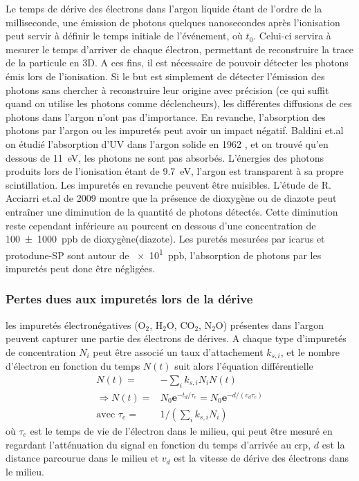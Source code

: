         Le temps de dérive des électrons dans l'argon liquide étant de l'ordre de la milliseconde, une émission de photons quelques nanosecondes après l'ionisation peut servir à définir le temps initiale de l'événement, où $t_0$. Celui-ci servira à mesurer le temps d'arriver de chaque électron, permettant de reconstruire la trace de la particule en 3D. A ces fins, il est nécessaire de pouvoir détecter les photons émis lors de l'ionisation. Si le but est simplement de détecter l'émission des photons sans chercher à reconstruire leur origine avec précision (ce qui suffit quand on utilise les photons comme déclencheurs), les différentes diffusions de ces photons dans l'argon n'ont pas d'importance. En revanche, l'absorption des photons par l'argon ou les impuretés peut avoir un impact négatif. Baldini et.al on étudié l'absorption d'UV dans l'argon solide en 1962 \cite{Baldini1962}, et on trouvé qu'en dessous de \SI{11}{\eV}, les photons ne sont pas absorbés. L'énergies des photons produits lors de l'ionisation étant de \SI{9.7}{\eV}, l'argon est transparent à sa propre scintillation. Les impuretés en revanche peuvent être nuisibles. L'étude de R. Acciarri et.al de 2009\cite{Acciarri2009} montre que la présence de dioxygène ou de diazote peut entraîner une diminution de la quantité de photons détectés. Cette diminution reste cependant inférieure au pourcent en dessous d'une concentration de \SI{100(1000)}{ppb} de dioxygène(diazote). Les puretés mesurées par \gls{icarus}\cite{Antonello2014} et proto\gls{dune}-SP sont autour de \SI{e1}{ppb}, l'absorption de photons par les impuretés peut donc être négligées.

      \subsubsection{Pertes dues aux impuretés lors de la dérive}
        
        les impuretés électronégatives (O$_2$, H$_2$O, CO$_2$, N$_2$O) présentes dans l'argon peuvent capturer une partie des électrons de dérives. A chaque type d'impuretés de concentration $N_i$ peut être associé un taux d'attachement $k_{s,i}$, et le nombre d'électron en fonction du temps $N(t)$ suit alors l'équation différentielle\cite{Buckley1989}
        \begin{eqnarray}
          N(t) = & -\sum_{i} k_{s,i}N_i N(t)\\
          \Rightarrow N(t) = & N_0\textbf{e}^{-t_d/\tau_e}=N_0\textbf{e}^{-d/(v_d\tau_e)}\label{eq::losses} \\
          \text{avec } \tau_e = & 1/(\sum_{i} k_{s,i}N_i)
        \end{eqnarray}
        où $\tau_e$ est le temps de vie de l'électron dans le milieu, qui peut être mesuré en regardant l'atténuation du signal en fonction du temps d'arrivée au \gls{crp}, $d$ est la distance parcourue dans le milieu et $v_d$ est la vitesse de dérive des électrons dans le milieu.

